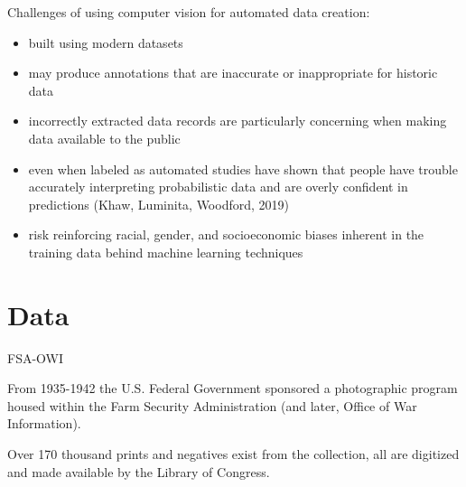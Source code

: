 \documentclass[12pt,ignorenonframetext,aspectratio=169]{beamer}
\begin{document}
\begin{frame}{}

Challenges of using computer vision for automated data creation:

\begin{itemize}
\item built using modern datasets \pause
\item may produce annotations that are inaccurate or inappropriate for historic data  \pause
\item incorrectly extracted data records are particularly concerning when making data
available to the public  \pause
\item even when labeled as automated studies have shown that people have trouble accurately
interpreting probabilistic data and are overly confident in predictions
(Khaw, Luminita, Woodford, 2019)  \pause
\item risk reinforcing racial, gender, and socioeconomic biases inherent in the training
data behind machine learning techniques
\end{itemize}

\end{frame}

\section{Data}

\begin{frame}{FSA-OWI}

From 1935-1942 the U.S. Federal Government sponsored a photographic program housed within
the Farm Security Administration (and later, Office of War Information).

Over 170 thousand prints and negatives exist from the collection, all are digitized and
made available by the Library of Congress.

\end{frame}
\end{document}
